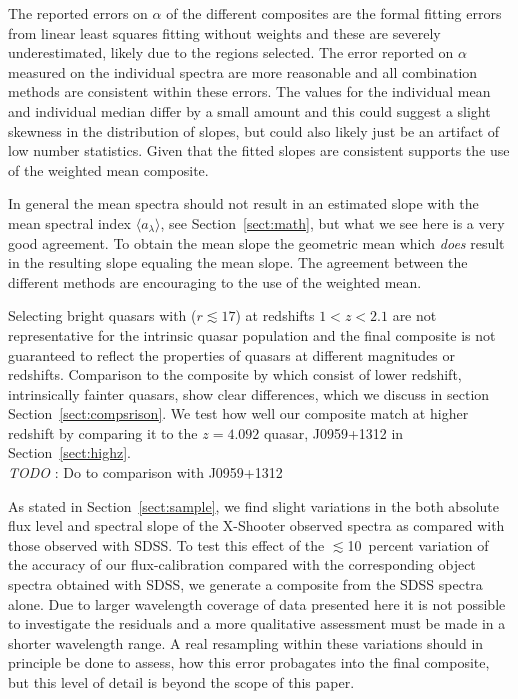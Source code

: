 \documentclass{aa}    %
\newcommand{\tablabel}[1]{\label{tab:#1}}
\newcommand{\sectionname}{Section}
\newcommand{\Sect}[1]{\sectionname~\ref{sect:#1}}
\newcommand{\sect}[1]{\Sect{#1}}
\newcommand{\todo}[3]{{\color{#2}\emph{#1}: #3}}
\newcommand{\jstodo}[1]{\todo{ \\TODO }{green}{#1}}
\begin{document}
 \tablabel{comb_meth} 

The reported errors on $\alpha$ of the different composites are the formal fitting errors from linear least squares fitting without weights and these are severely underestimated, likely due to the regions selected. The error reported on $\alpha$ measured on the individual spectra are more reasonable and all combination methods are consistent within these errors. The values for the individual mean and individual median differ by a small amount and this could suggest a slight skewness in the distribution of slopes, but could also likely just be an artifact of low number statistics. Given that the fitted slopes are consistent supports the use of the weighted mean composite.

In general the mean spectra should not result in an estimated slope with the mean spectral index $\langle a_\lambda\rangle$, see \sect{math}, but what we see here is a very good agreement. To obtain the mean slope the geometric mean which \textit{does} result in the resulting slope equaling the mean slope. The agreement between the different methods are encouraging to the use of the weighted mean.





Selecting bright quasars with ($r \lesssim 17$) at redshifts $1 < z < 2.1$ are not representative for the intrinsic quasar population \citep{Paris2014} and the final composite is not guaranteed to reflect the properties of quasars at different magnitudes or redshifts. Comparison to the composite by \citep{VandenBerk2001} which consist of lower redshift, intrinsically fainter quasars, show clear differences, which we discuss in section \sect{compsrison}. We test how well our composite match at higher redshift by comparing it to the $z=4.092$ quasar, J0959+1312 in \sect{highz}.
\jstodo{Do to comparison with J0959+1312}





As stated in \sect{sample}, we find slight variations in the both absolute flux level and spectral slope of the X-Shooter observed spectra as compared with those observed with SDSS. To test this effect of the $\lesssim$10~percent variation of the accuracy of our flux-calibration compared with the corresponding object spectra obtained with SDSS, we generate a composite from the SDSS spectra alone. Due to larger wavelength coverage of data presented here it is not possible to investigate the residuals and a more qualitative assessment must be made in a shorter wavelength range.
A real resampling within these variations should in principle be done to assess, how this error probagates into the final composite, but this level of detail is beyond the scope of this paper. 
\end{document}
